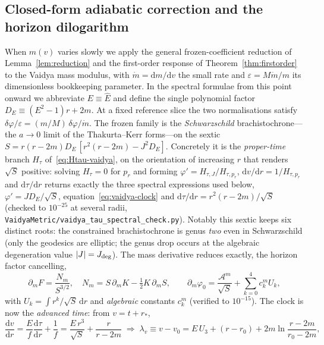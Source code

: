 \documentclass[12pt]{iopart}
\newcommand{\Ehat}{\hat E}
\newcommand{\dd}{\mathrm{d}}
\theoremstyle{plain}
\theoremstyle{definition}
\theoremstyle{plain}
\theoremstyle{remark}
\begin{document}
\subsection{Closed-form adiabatic correction and the horizon dilogarithm}
\label{sec:vaidya-adiabatic}
When $m(v)$ varies slowly we apply the general frozen-coefficient reduction of
Lemma~\ref{lem:reduction} and the first-order response of Theorem~\ref{thm:firstorder} to the Vaidya mass modulus, with
$\dot m=\dd m/\dd v$ the small rate and $\varepsilon=M\dot m/m$ its dimensionless
bookkeeping parameter. In the spectral formulae from this point onward we abbreviate
$E\equiv\Ehat$ and define the single polynomial factor
$D_E\equiv(E^2-1)r+2m$. At a fixed reference slice the two normalisations satisfy
$\delta\varphi/\varepsilon=(m/M)\,\delta\varphi/\dot m$. The frozen family
is the \emph{Schwarzschild} brachistochrone---the $a\to0$ limit of the
Thakurta--Kerr forms---on the sextic
$S=r(r-2m)D_E\,[r^2(r-2m)-J^2 D_E]$. Concretely it is the \emph{proper-time} branch
$H_\tau$ of~\eqref{eq:Htau-vaidya}, on the orientation of increasing $r$ that renders
$\sqrt S$ positive: solving $H_\tau=0$ for $p_r$ and forming
$\varphi'=H_{\tau,J}/H_{\tau,p_r}$, $\dd v/\dd r=1/H_{\tau,p_r}$ and $\dd\tau/\dd r$
returns exactly the three spectral expressions used below,
$\varphi'=J D_E/\sqrt S$, equation~\eqref{eq:vaidya-clock} and
$\dd\tau/\dd r=r^2(r-2m)/\sqrt S$ (checked to $10^{-25}$ at several radii, \texttt{VaidyaMetric/vaidya\_tau\_spectral\_check.py}). Notably this
sextic keeps six distinct roots: the constrained brachistochrone is genus \emph{two} even in
Schwarzschild (only the geodesics are elliptic; the genus drop occurs at the algebraic
degeneration value $|J|=J_{\rm deg}$). The mass derivative reduces exactly, the horizon factor cancelling,
\begin{equation}
    \partial_m F=\frac{N_m}{S^{3/2}},\quad N_m=S\,\partial_m K-\tfrac12 K\,\partial_m S,
    \qquad
    \partial_m\varphi_0=\frac{\mathcal{A}^m}{\sqrt S}+\sum_{k=0}^4 c_k^m U_k,
    \label{eq:dm-reduction}
\end{equation}
with $U_k=\int r^k/\sqrt S\,\dd r$ and \emph{algebraic} constants $c_k^m$ (verified
to $10^{-15}$). The clock is now the \emph{advanced time}: from $v=t+r_*$,
\begin{equation}
    \frac{\dd v}{\dd r}=\frac{E}{f}\frac{\dd\tau}{\dd r}+\frac1f
    =\frac{E\,r^3}{\sqrt S}+\frac{r}{r-2m}
    \;\Rightarrow\;
    \lambda_v\equiv v-v_0=E\,U_3+(r-r_0)+2m\ln\frac{r-2m}{r_0-2m},
    \label{eq:vaidya-clock}
\end{equation}
\end{document}
